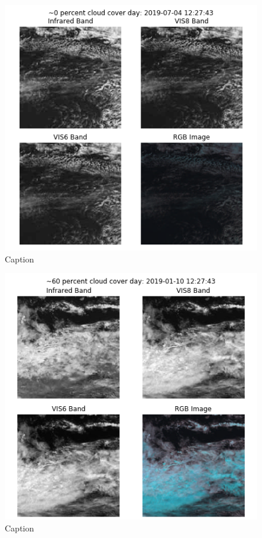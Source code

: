 \begin{figure}[H]
    \centering
    \includegraphics[totalheight=0.4\textheight]{0_per_day_sea.png}
    \caption{Caption}
    \label{fig:my_label}
\end{figure}


\begin{figure}[H]
    \centering
    \includegraphics[totalheight=0.4\textheight]{60_per_day_sea.png}
    \caption{Caption}
    \label{fig:my_label}
\end{figure}


